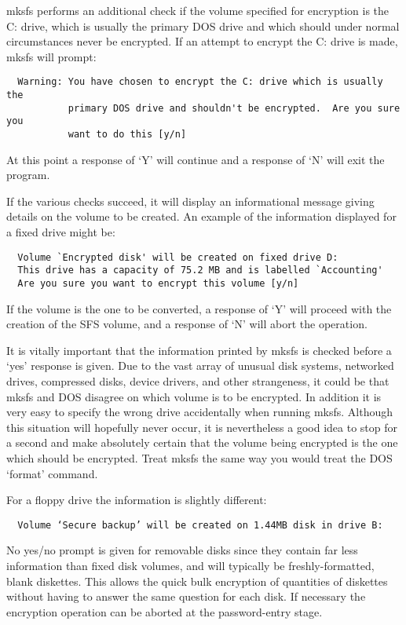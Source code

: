 mksfs performs an additional check if the volume specified for encryption is
the C: drive, which is usually the primary DOS drive and which should under
normal circumstances never be encrypted.  If an attempt to encrypt the C: drive
is made, mksfs will prompt:
{\small

\begin{verbatim}
  Warning: You have chosen to encrypt the C: drive which is usually the
           primary DOS drive and shouldn't be encrypted.  Are you sure you 
           want to do this [y/n]
\end{verbatim}

}
At this point a response of `Y' will continue and a response of `N' will exit
the program.

If the various checks succeed, it will display an informational message giving
details on the volume to be created.  An example of the information displayed
for a fixed drive might be:

\begin{verbatim}
  Volume `Encrypted disk' will be created on fixed drive D:
  This drive has a capacity of 75.2 MB and is labelled `Accounting'
  Are you sure you want to encrypt this volume [y/n]
\end{verbatim}

If the volume is the one to be converted, a response of `Y' will proceed with
the creation of the SFS volume, and a response of `N' will abort the operation.

It is vitally important that the information printed by mksfs is checked before
a `yes' response is given.  Due to the vast array of unusual disk systems,
networked drives, compressed disks, device drivers, and other strangeness, it
could be that mksfs and DOS disagree on which volume is to be encrypted.  In
addition it is very easy to specify the wrong drive accidentally when running
mksfs.  Although this situation will hopefully never occur, it is nevertheless
a good idea to stop for a second and make absolutely certain that the volume
being encrypted is the one which should be encrypted.  Treat mksfs the same way
you would treat the DOS `format' command.

For a floppy drive the information is slightly different:

{\tt \verb|  |Volume `Secure backup' will be created on 1.44MB disk in drive B:}

No yes/no prompt is given for removable disks since they contain far less
information than fixed disk volumes, and will typically be freshly-formatted,
blank diskettes.  This allows the quick bulk encryption of quantities of
diskettes without having to answer the same question for each disk.  If
necessary the encryption operation can be aborted at the password-entry stage.

